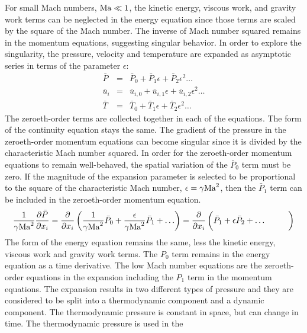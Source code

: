 For small Mach numbers, ${\rm Ma} \ll 1$, the kinetic energy, viscous
work, and gravity work terms can be neglected in the energy equation
since those terms are scaled by the square of the Mach number.  The
inverse of Mach number squared remains in the momentum equations,
suggesting singular behavior. In order to explore the singularity, 
the pressure, velocity and temperature are expanded as asymptotic
series in terms of the parameter $\epsilon$:
%
\begin{eqnarray}
   \bar{P} & = & \bar{P}_0     + \bar{P}_1 \epsilon     + \bar{P}_2 \epsilon^2 \ldots \\
 \bar{u}_i & = & \bar{u}_{i,0} + \bar{u}_{i,1} \epsilon + \bar{u}_{i,2} \epsilon^2 \ldots \\
   \bar{T} & = & \bar{T}_0     + \bar{T}_1 \epsilon     + \bar{T}_2 \epsilon^2 \ldots
\end{eqnarray}
%
The zeroeth-order terms are collected together in each of the
equations.  The form of the continuity equation stays the same. 
The gradient of the pressure in the zeroeth-order
momentum equations can become singular since it is divided by the 
characteristic Mach number squared.  In order for the zeroeth-order
momentum equations to remain well-behaved, the spatial variation of 
the $\bar{P}_0$ term must be zero.  If the magnitude of the expansion 
parameter is selected to be proportional to the square of the characteristic 
Mach number, $\epsilon = \gamma {\rm Ma}^2$,
then the $\bar{P}_1$ term can be included in the zeroeth-order
momentum equation.
%
\begin{equation}
   {1 \over {\gamma {\rm Ma}^2}}
   {{\partial \bar{P}} \over {\partial x_i}}  =
   {{\partial} \over {\partial x_i}} \left( {1 \over {\gamma {\rm Ma}^2}} \bar{P}_0
       + {\epsilon \over {\gamma {\rm Ma}^2}} \bar{P}_1 + \ldots \right) =
   {{\partial} \over {\partial x_i}} \left( \bar{P}_1 + \epsilon \bar{P}_2 + \ldots 
   \phantom{1 \over {\gamma {\rm Ma}^2}} \right)
\end{equation}
%
The form of the energy equation remains the same, less the kinetic
energy, viscous work and gravity work terms.  The $P_0$
term remains in the energy equation as a time derivative.  
The low Mach number equations are the zeroeth-order equations
in the expansion including the $P_1$ term in the momentum
equations. The expansion results in two different types of pressure and
they are considered to be split into a thermodynamic component
and a dynamic component.  The thermodynamic pressure is constant in space,
but can change in time.  The thermodynamic pressure is used in the
